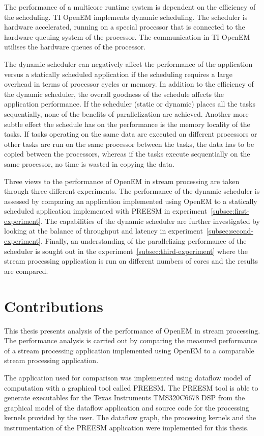 The performance of a multicore runtime system is dependent on the efficiency of the scheduling. TI OpenEM implements dynamic scheduling. The scheduler is hardware accelerated, running on a special processor that is connected to the hardware queuing system of the processor. The communication in TI OpenEM utilises the hardware queues of the processor.

The dynamic scheduler can negatively affect the performance of the application versus a statically scheduled application if the scheduling requires a large overhead in terms of processor cycles or memory. In addition to the efficiency of the dynamic scheduler, the overall goodness of the schedule affects the application performance. If the scheduler (static or dynamic) places all the tasks sequentially, none of the benefits of parallelization are achieved. Another more subtle effect the schedule has on the performance is the memory locality of the tasks. If tasks operating on the same data are executed on different processors or other tasks are run on the same processor between the tasks, the data has to be copied between the processors, whereas if the tasks execute sequentially on the same processor, no time is wasted in copying the data.

Three views to the performance of OpenEM in stream processing are taken through three different experiments. The performance of the dynamic scheduler is assessed by comparing an application implemented using OpenEM to a statically scheduled application implemented with PREESM in experiment~\ref{subsec:first-experiment}. The capabilities of the dynamic scheduler are further investigated by looking at the balance of throughput and latency in experiment~\ref{subsec:second-experiment}. Finally, an understanding of the parallelizing performance of the scheduler is sought out in the experiment~\ref{subsec:third-experiment} where the stream processing application is run on different numbers of cores and the results are compared.

\section{Contributions}
\label{section:contributions}
This thesis presents analysis of the performance of OpenEM in stream processing. The performance analysis is carried out by comparing the measured performance of a stream processing application implemented using OpenEM to a comparable stream processing application.

The application used for comparison was implemented using dataflow model of computation with a graphical tool called PREESM. The PREESM tool is able to generate executables for the Texas Instruments TMS320C6678 DSP from the graphical model of the dataflow application and source code for the processing kernels provided by the user. The dataflow graph, the processing kernels and the instrumentation of the PREESM application were implemented for this thesis.

